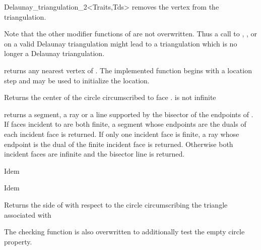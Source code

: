 \begin{ccClassTemplate} {Delaunay_triangulation_2<Traits,Tds>}
{removes the vertex from the triangulation.}

Note that the other modifier functions  of
 are not overwritten.
Thus a  call to 
, ,
  or 
on a valid Delaunay triangulation might lead to a triangulation
which is no longer a Delaunay triangulation.


{returns any nearest vertex of . The implemented function
begins with a location step and
 may be used to initialize the location.}





{Returns the center of the circle circumscribed to face .
\ccPrecond {} is not infinite}

{returns a segment, a ray or a line supported by the bisector of the
endpoints of .
If faces incident to  are both finite, a segment whose endpoints are the
duals of each incident face is returned. If only one incident face is
finite, a
ray whose endpoint is the dual of the finite incident face is returned.
Otherwise both incident faces
are infinite and the bisector line is returned.}

{Idem}

{Idem}



\ccThreeToTwo

{Returns the side of  with respect to the circle circumscribing
 the triangle associated with }


\begin{ccAdvanced}

The checking function  is also overwritten
to additionally test the empty circle property.


\end{ccAdvanced}
\end{ccClassTemplate}
